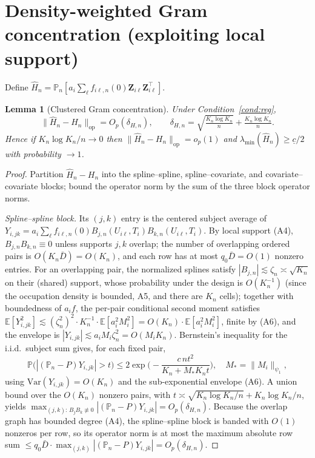 \documentclass[11pt]{article}
\newtheorem{lemma}{Lemma}
\theoremstyle{remark}\newtheorem{remark}{Remark}
\newcommand{\E}{\mathbb{E}}
\newcommand{\PR}{\mathbb{P}}
\newcommand{\Pn}{\mathbb{P}_n}
\newcommand{\Z}{\bm{Z}}
\newcommand{\op}{\mathrm{op}}
\begin{document}
\section{Density-weighted Gram concentration (exploiting local support)}
Define $\widehat H_n=\Pn[a_i\sum_\ell f_{i\ell,n}(0)\Z_{i\ell}\Z_{i\ell}^\top]$.
\begin{lemma}[Clustered Gram concentration]\label{lem:gram}
Under Condition~\ref{cond:reg},
\[
\|\widehat H_n-H_n\|_\op=O_p(\delta_{H,n}),\qquad
\delta_{H,n}=\sqrt{\tfrac{K_n\log K_n}{n}}+\tfrac{K_n\log K_n}{n}.
\]
Hence if $K_n\log K_n/n\to0$ then $\|\widehat H_n-H_n\|_\op=o_p(1)$ and
$\lambda_{\min}(\widehat H_n)\ge\underline c/2$ with probability $\to1$.
\end{lemma}
\begin{proof}
Partition $\widehat H_n-H_n$ into the spline--spline, spline--covariate, and
covariate--covariate blocks; bound the operator norm by the sum of the three
block operator norms.

\emph{Spline--spline block.} Its $(j,k)$ entry is the centered subject average of
$Y_{i,jk}=a_i\sum_\ell f_{i\ell,n}(0)B_{j,n}(U_{i\ell},T_i)B_{k,n}(U_{i\ell},T_i)$.
By local support (A4), $B_{j,n}B_{k,n}\equiv0$ unless supports $j,k$ overlap; the
number of overlapping ordered pairs is $O(K_n\bar D)=O(K_n)$, and each row has at
most $q_0\bar D=O(1)$ nonzero entries. For an overlapping pair, the normalized
splines satisfy $|B_{j,n}|\lesssim\zeta_n\asymp\sqrt{K_n}$ on their (shared)
support, whose probability under the design is $O(K_n^{-1})$ (since the
occupation density is bounded, A5, and there are $K_n$ cells); together with
boundedness of $a_i f$, the per-pair conditional second moment satisfies
$\E[Y_{i,jk}^2]\lesssim (\zeta_n^2)^2\cdot K_n^{-1}\cdot\E[a_i^2 M_i^2]
=O(K_n)\cdot\E[a_i^2 M_i^2]$, finite by (A6), and the envelope is
$|Y_{i,jk}|\lesssim a_i M_i\zeta_n^2=O(M_i K_n)$. Bernstein's inequality for the
i.i.d.\ subject sum gives, for each fixed pair,
\[
\PR\big(|(\Pn-P)Y_{i,jk}|>t\big)\le
2\exp\!\Big(-\frac{c\,n t^2}{K_n+M_*K_n t}\Big),\quad M_*=\|M_i\|_{\psi_1},
\]
using $\mathrm{Var}(Y_{i,jk})=O(K_n)$ and the sub-exponential envelope (A6). A
union bound over the $O(K_n)$ nonzero pairs, with $t\asymp\sqrt{K_n\log K_n/n}
+K_n\log K_n/n$, yields $\max_{(j,k):\,B_jB_k\not\equiv0}|(\Pn-P)Y_{i,jk}|
=O_p(\delta_{H,n})$. Because the overlap graph has bounded degree (A4), the
spline--spline block is banded with $O(1)$ nonzeros per row, so its operator norm
is at most the maximum absolute row sum $\le q_0\bar D\cdot
\max_{(j,k)}|(\Pn-P)Y_{i,jk}|=O_p(\delta_{H,n})$.


\end{proof}
\end{document}
